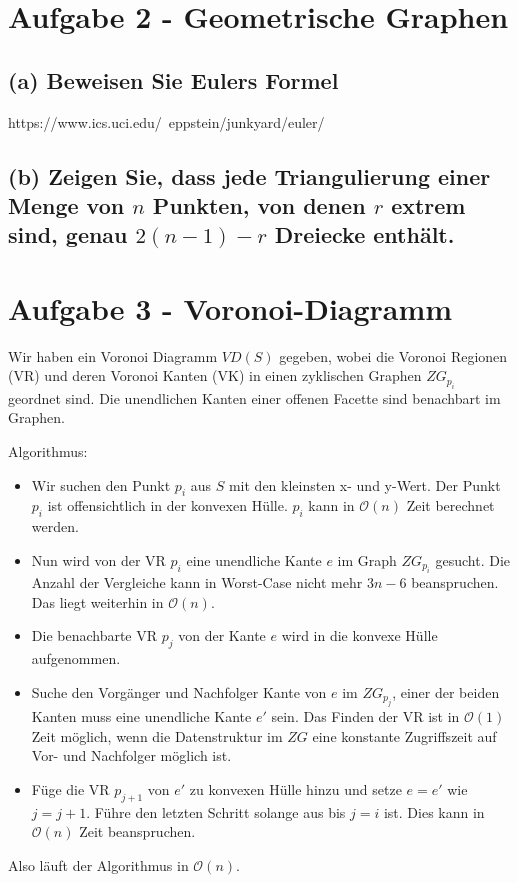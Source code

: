 \documentclass[a4paper]{article}
\begin{document}
\section*{Aufgabe 2 - Geometrische Graphen}

\subsection*{(a) Beweisen Sie Eulers Formel}

https://www.ics.uci.edu/~eppstein/junkyard/euler/

\subsection*{(b) Zeigen Sie, dass jede Triangulierung einer Menge von $n$ Punkten, von denen $r$ extrem sind, genau $2 (n - 1) - r$ Dreiecke enthält.}



\section*{Aufgabe 3 - Voronoi-Diagramm}


Wir haben ein Voronoi Diagramm $VD(S)$ gegeben, wobei die Voronoi Regionen (VR) und deren Voronoi Kanten (VK) in einen zyklischen Graphen $ZG_{p_i}$ geordnet sind. Die unendlichen Kanten einer offenen Facette sind benachbart im Graphen. 

Algorithmus:

\begin{itemize}

\item Wir suchen den Punkt $p_i$ aus $S$ mit den kleinsten x- und y-Wert. Der Punkt $p_i$ ist offensichtlich in der konvexen Hülle. $p_i$ kann in $\mathcal{O}(n)$ Zeit berechnet werden.

\item Nun wird von der VR $p_i$ eine unendliche Kante $e$ im Graph $ZG_{p_i}$ gesucht. Die Anzahl der Vergleiche kann in Worst-Case nicht mehr $3 n-6$ beanspruchen. Das liegt weiterhin in $\mathcal{O}(n)$.

\item Die benachbarte VR $p_j$ von der Kante $e$ wird in die konvexe Hülle aufgenommen.

\item Suche den Vorgänger und Nachfolger Kante von $e$ im $ZG_{p_j}$, einer der beiden Kanten muss eine unendliche Kante $e'$ sein. Das Finden der VR ist in $\mathcal{O}(1)$ Zeit möglich, wenn die Datenstruktur im $ZG$ eine konstante Zugriffszeit auf Vor- und Nachfolger möglich ist. 

\item Füge die VR $p_{j+1}$ von $e'$ zu konvexen Hülle hinzu und setze $e = e'$ wie $j=j+1$. Führe den letzten Schritt solange aus bis $j=i$ ist. Dies kann in $\mathcal{O}(n)$ Zeit beanspruchen.

\end{itemize}

Also läuft der Algorithmus in $\mathcal{O}(n)$.
\end{document}
